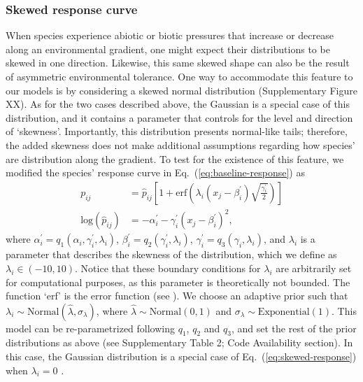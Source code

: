 \documentclass[11pt, a4paper]{article}
\begin{document}
\subsubsection*{Skewed response curve}
When species experience abiotic or biotic pressures that increase or decrease along an environmental gradient, one might expect their distributions to be skewed in one direction. Likewise, this same skewed shape can also be the result of asymmetric environmental tolerance. One way to accommodate this feature to our models is by considering a skewed normal distribution (Supplementary Figure XX). As for the two cases described above, the Gaussian is a special case of this distribution, and it contains a parameter that controls for the level and direction of `skewness'. Importantly, this distribution presents normal-like tails; therefore, the added skewness does not make additional assumptions regarding how species' are distribution along the gradient. To test for the existence of this feature, we modified the species' response curve in Eq.~(\ref{eq:baseline-response}) as
\begin{equation}
\begin{split}
p_{ij} & =\hat{p}_{ij} \left[1+\text{erf}\left(\lambda_{i}\left(x_{j}-\beta^{\prime}_{i}\right)\sqrt{\frac{\gamma^{\prime}_{i}}{2}}\right)\right] \\
\text{log}\left(\hat{p}_{ij}\right) & = -\alpha^{\prime}_{i} - \gamma^{\prime}_{i} \left(x_{j}-\beta^{\prime}_{i}\right)^2 ,
\end{split}
\label{eq:skewed-response}
\end{equation}
where $\alpha^{\prime}_{i} = q_{1}\left(\alpha_{i}, \gamma^{\prime}_{i}, \lambda_{i}\right)$, $\beta^{\prime}_{i} = q_{2}\left(\gamma^{\prime}_{i}, \lambda_{i}\right)$, $\gamma^{\prime}_{i} = q_{3}\left(\gamma_{i}, \lambda_{i}\right)$, and $\lambda_{i}$ is a parameter that describes the skewness of the distribution, which we define as $\lambda_{i}\in\left(-10, 10\right)$. Notice that these boundary conditions for $\lambda_{i}$ are arbitrarily set for computational purposes, as this parameter is theoretically not bounded. The function `erf' is the error function (see \citealt{stats book}). We choose an adaptive prior such that $\lambda_{i}\sim \text{Normal}\left(\hat{\lambda}, \sigma_{\lambda}\right)$, where $\hat{\lambda}\sim\text{Normal}\left(0, 1\right)$ and $\sigma_{\lambda}\sim\text{Exponential}\left(1\right)$. This model can be re-parametrized following $q_1$, $q_2$ and $q_3$, and set the rest of the prior distributions as above (see Supplementary Table 2; Code Availability section). In this case, the Gaussian distribution is a special case of Eq.~(\ref{eq:skewed-response}) when $\lambda_{i}=0$ \citep{stats book}.
\end{document}
